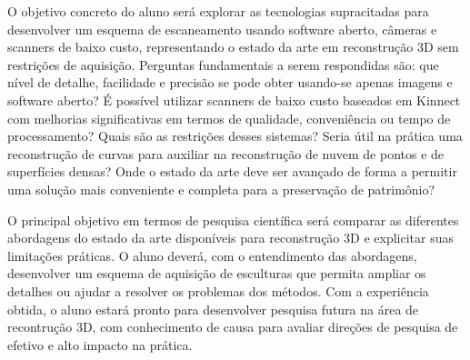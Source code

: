O objetivo concreto do aluno será explorar as tecnologias supracitadas para
desenvolver um esquema de escaneamento usando software aberto, câmeras e
scanners de baixo custo, representando o estado da arte em reconstrução 3D sem
restrições de aquisição. Perguntas fundamentais a serem respondidas são: que
nível de detalhe, facilidade e precisão se pode obter usando-se apenas imagens e software
aberto? É possível utilizar scanners de baixo custo baseados em Kinnect com
melhorias significativas em termos de qualidade, conveniência ou tempo de
processamento?  Quais são as restrições desses sistemas? Seria útil na prática
uma reconstrução de curvas para auxiliar na reconstrução de nuvem de pontos e de
superfícies densas? Onde o estado da arte deve ser avançado de forma a permitir
uma solução mais conveniente e completa para a preservação de patrimônio?

O principal objetivo em termos de pesquisa científica será comparar as
diferentes abordagens do estado da arte disponíveis para reconstrução 3D e
explicitar suas limitações práticas. O aluno deverá, com o entendimento das
abordagens, desenvolver um esquema de aquisição de esculturas que permita
ampliar os detalhes ou ajudar a resolver os problemas dos métodos. Com a
experiência obtida, o aluno estará pronto para desenvolver pesquisa futura na
área de recontrução 3D, com conhecimento de causa para avaliar direções de
pesquisa de efetivo e alto impacto na prática.


